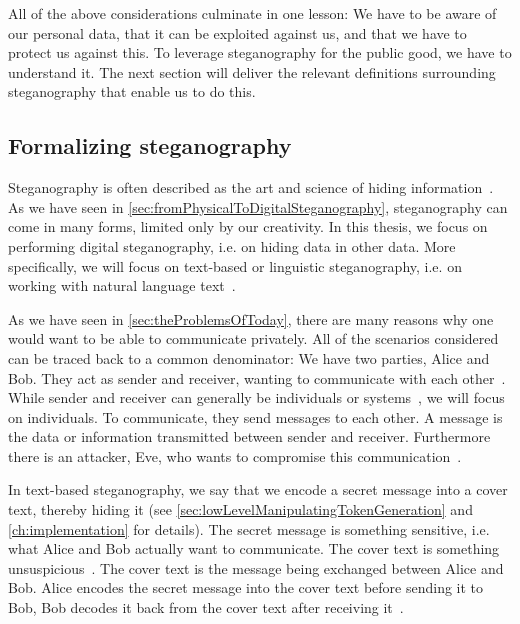 All of the above considerations culminate in one lesson: We have to be aware of our personal data, that it can be exploited against us, and that we have to protect us against this. To leverage steganography for the public good, we have to understand it. The next section will deliver the relevant definitions surrounding steganography that enable us to do this.

\subsection{Formalizing steganography}
\label{sec:formalizingSteganography}
Steganography is often described as the art and science of hiding information~\cite{bennettLinguisticSteganographySurvey2004,wuGenerativeTextSteganography2024}. As we have seen in \cref{sec:fromPhysicalToDigitalSteganography}, steganography can come in many forms, limited only by our creativity. In this thesis, we focus on performing digital steganography, i.e. on hiding data in other data. More specifically, we will focus on text-based or linguistic steganography, i.e. on working with natural language text~\cite{zieglerNeuralLinguisticSteganography2019}.

As we have seen in \cref{sec:theProblemsOfToday}, there are many reasons why one would want to be able to communicate privately. All of the scenarios considered can be traced back to a common denominator: We have two parties, Alice and Bob. They act as sender and receiver, wanting to communicate with each other~\cite{wuGenerativeTextSteganography2024}. While sender and receiver can generally be individuals or systems~\cite{bennettLinguisticSteganographySurvey2004}, we will focus on individuals. To communicate, they send messages to each other. A message is the data or information transmitted between sender and receiver. Furthermore there is an attacker, Eve, who wants to compromise this communication~\cite{al-aniOverviewMainFundamentals2010,wuGenerativeTextSteganography2024}.

In text-based steganography, we say that we encode a secret message into a cover text, thereby hiding it (see \cref{sec:lowLevelManipulatingTokenGeneration} and \cref{ch:implementation} for details). The secret message is something sensitive, i.e. what Alice and Bob actually want to communicate. The cover text is something unsuspicious~\cite{al-aniOverviewMainFundamentals2010}. The cover text is the message being exchanged between Alice and Bob. Alice encodes the secret message into the cover text before sending it to Bob, Bob decodes it back from the cover text after receiving it~\cite{al-aniOverviewMainFundamentals2010}.


